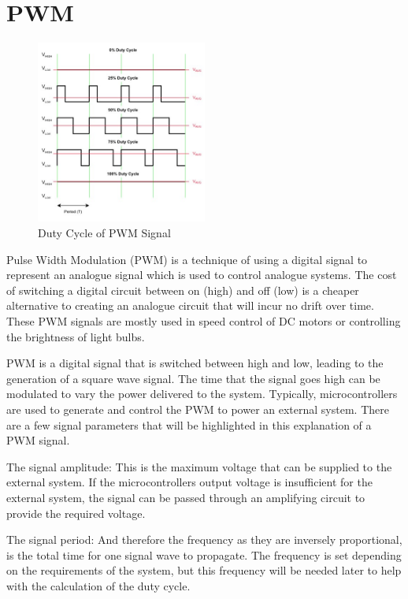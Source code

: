\section{PWM}
\begin{figure}
	\begin{center}
		\includegraphics[width = 0.5\textwidth]{figures/PWM.jpg}
		\caption{Duty Cycle of PWM Signal}
		\label{fig:2:PWM}
	\end{center}
\end{figure}
Pulse Width Modulation (PWM) is a technique of using a digital signal to represent an analogue signal which is used to control analogue systems. The cost of switching a digital circuit between on (high) and off (low) is a cheaper alternative to creating an analogue circuit that will incur no drift over time. These PWM signals are mostly used in speed control of DC motors or controlling the brightness of light bulbs. \cite{Christ2014}\par
\vspace{0.6cm}
PWM is a digital signal that is switched between high and low, leading to the generation of a square wave signal. The time that the signal goes high can be modulated to vary the power delivered to the system. Typically, microcontrollers are used to generate and control the PWM to power an external system. There are a few signal parameters that will be highlighted in this explanation of a PWM signal. \par 
\vspace{0.6cm}
The signal amplitude: This is the maximum voltage that can be supplied to the external system. If the microcontrollers output voltage is insufficient for the external system, the signal can be passed through an amplifying circuit to provide the required voltage.\par 
The signal period: And therefore the frequency as they are inversely proportional, is the total time for one signal wave to propagate. The frequency is set depending on the requirements of the system, but this frequency will be needed later to help with the calculation of the duty cycle. \par 
